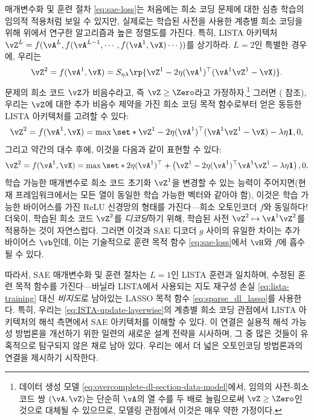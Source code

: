 \documentclass[../../book-main_ko.tex]{subfiles}
\begin{document}
매개변수화 및 훈련 절차 \eqref{eq:sae-loss}는 처음에는 희소 코딩 문제에 대한 심층 학습의 임의적 적용처럼 보일 수 있지만, 실제로는 학습된 사전을 사용한 계층별 희소 코딩을 위해 위에서 연구한 알고리즘과 높은 정렬도를 가진다. 특히, LISTA 아키텍처 $\vZ^{L} = f(\vA^L, f(\vA^{L-1}, \cdots, f(\vA^1, \vX) \cdots ))$를 상기하라. $L=2$인 특별한 경우에, 우리는
\begin{equation}
    \vZ^2 = f(\vA^1, \vX)
    =S_{\eta\lambda}\rp{\vZ^{1} - 2\eta(\vA^{1})^{\top}(\vA^1\vZ^{1} - \vX)}.
\end{equation}
문제의 희소 코드 $\vZ$가 비음수라고, 즉 $\vZ \geq \Zero$라고 가정하자.\footnote{데이터 생성 모델 \eqref{eq:overcomplete-dl-section-data-model}에서, 임의의 사전-희소 코드 쌍 $(\vA, \vZ)$는 단순히 $\vA$의 열 수를 두 배로 늘림으로써 $\vZ \geq \Zero$인 것으로 대체될 수 있으므로, 모델링 관점에서 이것은 매우 약한 가정이다.} 그러면 ( 참조), 우리는 $\vZ$에 대한 추가 비음수 제약을 가진 희소 코딩 목적 함수로부터 얻은 동등한 LISTA 아키텍처를 고려할 수 있다:
\begin{equation}
    \vZ^2 = f(\vA^1, \vX)
    =\max \set*{\vZ^{1} - 2\eta(\vA^{1})^{\top}(\vA^1\vZ^{1} - \vX)
    - \lambda\eta \mathbf{1}, 0},
\end{equation}
그리고 약간의 대수 후에, 이것을 다음과 같이 표현할 수 있다:
\begin{equation}
    \vZ^2 = f(\vA^1, \vX)
    =\max \set*{
        2\eta(\vA^{1})^{\top}
        +
        \left(
        \vZ^{1} - 2\eta(\vA^{1})^{\top}\vA^1\vZ^{1} - \lambda\eta \mathbf{1}
        \right), 0
    }.
\end{equation}
학습 가능한 매개변수로 희소 코드 초기화 $\vZ^1$을 변경할 수 있는 능력이 주어지면(현재 프레임워크에서는 모든 열이 동일한 학습 가능한 벡터와 같아야 함), 이것은 학습 가능한 바이어스를 가진 ReLU 신경망의 형태를 가진다—희소 오토인코더 $f$와 동일하다! 더욱이, 학습된 희소 코드 $\vZ^2$를 \textit{디코딩}하기 위해, 학습된 사전 $\vZ^2 \mapsto \vA^1 \vZ^2$를 적용하는 것이 자연스럽다. 그러면 이것과 SAE 디코더 $g$ 사이의 유일한 차이는 추가 바이어스 $\vb$인데, 이는 기술적으로 훈련 목적 함수 \eqref{eq:sae-loss}에서 $\vH$와 $f$에 흡수될 수 있다.

따라서, SAE 매개변수화 및 훈련 절차는 $L=1$인 LISTA 훈련과 일치하며, 수정된 훈련 목적 함수를 가진다—바닐라 LISTA에서 사용되는 지도 재구성 손실 \eqref{eq:lista-training} 대신 {\em 비지도}로 남아있는 LASSO 목적 함수 \eqref{eq:sparse_dl_lasso}를 사용한다. 특히, 우리는 \eqref{eq:ISTA-update-layerwise}의 계층별 희소 코딩 관점에서 LISTA 아키텍처의 해석 측면에서 SAE 아키텍처를 이해할 수 있다. 이 연결은 실용적 해석 가능성 방법론을 개선하기 위한 일련의 새로운 설계 전략을 시사하며, 그 중 많은 것들이 유혹적으로 탐구되지 않은 채로 남아 있다. 우리는 에서 더 넓은 오토인코딩 방법론과의 연결을 제시하기 시작한다.
\end{document}
